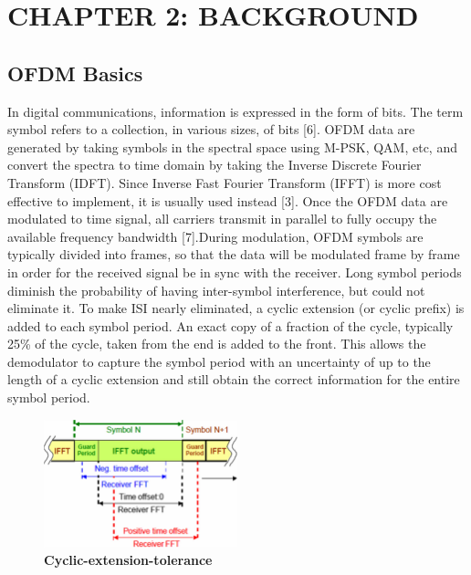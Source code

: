\section*{CHAPTER 2: BACKGROUND}
\setcounter{section}{2}
\setcounter{subsection}{0}
\setcounter{figure}{0}
\setcounter{table}{0}

\subsection{OFDM Basics}

In digital communications, information is expressed in the form of bits. The term symbol refers to a collection, in various sizes, of bits [6]. OFDM data are generated by taking symbols in the spectral space using M-PSK, QAM, etc, and convert the spectra to time domain by taking the Inverse Discrete Fourier Transform (IDFT). Since Inverse Fast Fourier Transform (IFFT) is more cost effective to implement, it is usually used instead [3]. Once the OFDM data are modulated to time signal, all carriers transmit in parallel to fully occupy the available frequency bandwidth [7].During modulation, OFDM symbols are typically divided into frames, so that the data will be modulated frame by frame in order for the received signal be in sync with the receiver. Long symbol periods diminish the probability of having inter-symbol interference, but could not eliminate it. To make ISI nearly eliminated, a cyclic extension (or cyclic prefix) is added to each symbol period. An exact copy of a fraction of the cycle, typically 25\% of the cycle, taken from the end is added to the front. This allows the demodulator to capture the symbol period with an uncertainty of up to the length of a cyclic extension and still obtain the correct information for the entire symbol period.

\begin{figure}[ht]
    \centering
    \includegraphics[width=0.5\textwidth]{Figures/Cyclic-extension-tolerance.png}
    \caption{\bfseries\centering\fontsize{13pt}{0pt}\selectfont Cyclic-extension-tolerance}
    \label{Cyclic-extension-tolerance}
\end{figure}

